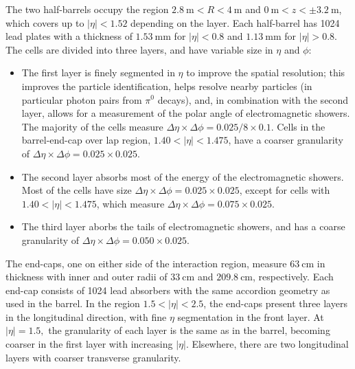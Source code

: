 The two half-barrels occupy the region $\SI{2.8}{\meter}<R<\SI{4}{\meter}$ and $\SI{0}{\meter}<z<\pm\SI{3.2}{\meter}$, which covers up to $|\eta|<1.52$ depending on the layer. Each half-barrel has 1024 lead plates with a thickness of $\SI{1.53}{\milli\meter}$ for $|\eta|<0.8$ and $\SI{1.13}{\milli\meter}$ for $|\eta|>0.8$. The cells are divided into three layers, and have variable size in $\eta$ and $\phi$:

\begin{itemize}
	\item The first layer is finely segmented in $\eta$ to improve the spatial resolution; this improves the particle identification, helps resolve nearby particles (in particular photon pairs from $\pi^0$ decays), and, in combination with the second layer, allows for a measurement of the polar angle of electromagnetic showers. The majority of the cells measure $\Delta\eta\times\Delta\phi=0.025/8\times0.1$. Cells in the barrel-end-cap over lap region, $1.40<|\eta|<1.475$, have a coarser granularity of $\Delta\eta\times\Delta\phi=0.025\times0.025$.

	\item The second layer absorbs most of the energy of the electromagnetic showers. Most of the cells have size $\Delta\eta\times\Delta\phi=0.025\times0.025$, except for cells with $1.40<|\eta|<1.475$, which measure $\Delta\eta\times\Delta\phi=0.075\times0.025$.

	\item The third layer aborbs the tails of electromagnetic showers, and has a coarse granularity of $\Delta\eta\times\Delta\phi=0.050\times0.025$.
\end{itemize}





The end-caps, one on either side of the interaction region, measure $\SI{63}{\centi\meter}$ in thickness with inner and outer radii of $\SI{33}{\centi\meter}$ and $\SI{209.8}{\centi\meter}$, respectively. 
Each end-cap consists of 1024 lead absorbers with the same accordion geometry as used in the barrel. In the region $1.5<|\eta|<2.5$, the end-caps present three layers in the longitudinal direction, with fine $\eta$ segmentation in the front layer. At $|\eta|=1.5,$ the granularity of each layer is the same as in the barrel, becoming coarser in the first layer with increasing $|\eta|$. Elsewhere, there are two longitudinal layers with coarser transverse granularity.


